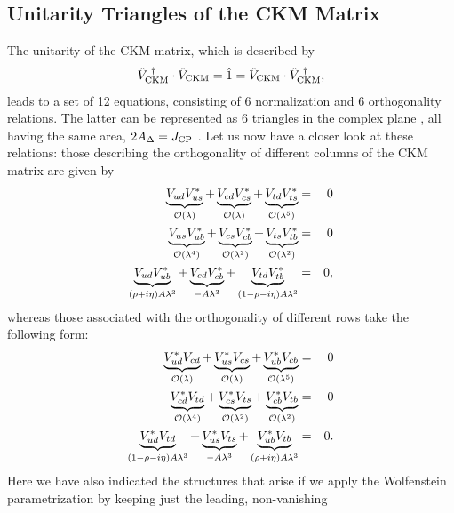\documentclass[11pt]{cernrep}
\begin{document}
%
%
%
\subsection{Unitarity Triangles of the CKM Matrix}\label{ssec:UT}
%
%
%
The unitarity of the CKM matrix, which is described by
\begin{equation}
\hat V_{\mbox{{\scriptsize CKM}}}^{\,\,\dagger}\cdot\hat 
V_{\mbox{{\scriptsize CKM}}}=
\hat 1=\hat V_{\mbox{{\scriptsize CKM}}}\cdot\hat V_{\mbox{{\scriptsize 
CKM}}}^{\,\,\dagger},
\end{equation}
leads to a set of 12 equations, consisting of 6 normalization 
and 6 orthogonality relations. The latter can be represented as 6 
triangles in the complex plane \cite{AKL}, all having the same area, 
$2 A_{\Delta}=J_{\rm CP}$ \cite{JS}. Let us now have a closer look at 
these relations: those describing the orthogonality of different columns 
of the CKM matrix are given by
\begin{eqnarray}
\underbrace{V_{ud}V_{us}^\ast}_{{\cal O}(\lambda)}+
\underbrace{V_{cd}V_{cs}^\ast}_{{\cal O}(\lambda)}+
\underbrace{V_{td}V_{ts}^\ast}_{{\cal O}(\lambda^5)} & = &
0\\
\underbrace{V_{us}V_{ub}^\ast}_{{\cal O}(\lambda^4)}+
\underbrace{V_{cs}V_{cb}^\ast}_{{\cal O}(\lambda^2)}+
\underbrace{V_{ts}V_{tb}^\ast}_{{\cal O}(\lambda^2)} & = &
0\\
\underbrace{V_{ud}V_{ub}^\ast}_{(\rho+i\eta)A\lambda^3}+
\underbrace{V_{cd}V_{cb}^\ast}_{-A\lambda^3}+
\underbrace{V_{td}V_{tb}^\ast}_{(1-\rho-i\eta)A\lambda^3} & = &
0,\label{UT1}
\end{eqnarray}
whereas those associated with the orthogonality of different rows 
take the following form:
\begin{eqnarray}
\underbrace{V_{ud}^\ast V_{cd}}_{{\cal O}(\lambda)}+
\underbrace{V_{us}^\ast V_{cs}}_{{\cal O}(\lambda)}+
\underbrace{V_{ub}^\ast V_{cb}}_{{\cal O}(\lambda^5)} & = &
0\\
\underbrace{V_{cd}^\ast V_{td}}_{{\cal O}(\lambda^4)}+
\underbrace{V_{cs}^\ast V_{ts}}_{{\cal O}(\lambda^2)}+
\underbrace{V_{cb}^\ast V_{tb}}_{{\cal O}(\lambda^2)} & = & 0\\
\underbrace{V_{ud}^\ast V_{td}}_{(1-\rho-i\eta)A\lambda^3}+
\underbrace{V_{us}^\ast V_{ts}}_{-A\lambda^3}+
\underbrace{V_{ub}^\ast V_{tb}}_{(\rho+i\eta)A\lambda^3}
& = & 0.\label{UT2}
\end{eqnarray}
Here we have also indicated the structures that arise if we apply the 
Wolfenstein parametrization by keeping just the leading, non-vanishing 
\end{document}
